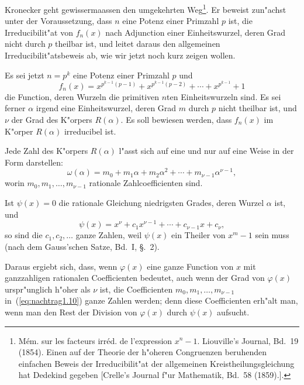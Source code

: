 \documentclass[10pt,a4paper]{article}
\theoremstyle{weberstyle}
\begin{document}
Kronecker geht gewissermaassen den umgekehrten Weg\footnote{M\'em. sur
les facteurs irr\'ed. de l'expression $x^n-1$. Liouville's Journal, Bd.~19
(1854). Einen auf der Theorie der h"oheren Congruenzen beruhenden
einfachen Beweis der Irreducibilit"at der allgemeinen Kreistheilungsgleichung
hat Dedekind gegeben [Crelle's Journal f"ur Mathematik, Bd.~58
(1859).].}. Er beweist zun"achst unter der Voraussetzung, dass $n$ eine
Potenz einer Primzahl $p$ ist, die Irreducibilit"at von $f_n(x)$ nach
Adjunction einer Einheitswurzel, deren Grad nicht durch $p$ theilbar ist,
und leitet daraus den allgemeinen Irreducibilit"atsbeweis ab, wie wir
jetzt noch kurz zeigen wollen.

Es sei jetzt $n=p^k$ eine Potenz einer Primzahl $p$ und
\begin{equation}\label{eq:nachtrag1.9}
f_n(x) = x^{p^{k-1}(p-1)} + x^{p^{k-1}(p-2)} + \cdots + x^{p^{k-1}} + 1
\end{equation}
die Function, deren Wurzeln die primitiven $n$ten Einheitswurzeln sind.
Es sei ferner $\alpha$ irgend eine Einheitswurzel, deren Grad $m$ durch
$p$ nicht theilbar ist, und $\nu$ der Grad des K"orpers $R(\alpha)$. Es
soll bewiesen werden, dass $f_n(x)$ im K"orper $R(\alpha)$ irreducibel ist.

Jede Zahl des K"orpers $R(\alpha)$ l"asst sich auf eine und nur auf eine
Weise in der Form darstellen:
\begin{equation}\label{eq:nachtrag1.10}
\omega(\alpha) = m_0 + m_1\alpha + m_2\alpha^2 + \cdots + m_{\nu-1}\alpha^{\nu-1},
\end{equation}
worin $m_0,m_1,\dots,m_{\nu-1}$ rationale Zahlcoefficienten sind.

Ist $\psi(x)=0$ die rationale Gleichung niedrigsten Grades, deren Wurzel
$\alpha$ ist, und
\begin{equation}\label{eq:nachtrag1.11}
\psi(x) = x^\nu + c_1x^{\nu-1} + \cdots + c_{\nu-1}x + c_\nu,
\end{equation}
so sind die $c_1,c_2,\dots$ ganze Zahlen, weil $\psi(x)$ ein Theiler von
$x^m-1$ sein muss (nach dem Gauss'schen Satze, Bd.~I, \S.~2).

Daraus ergiebt sich, dass, wenn $\varphi(x)$ eine ganze Function von $x$
mit ganzzahligen rationalen Coefficienten bedeutet, auch wenn der Grad
von $\varphi(x)$ urspr"unglich h"oher als $\nu$ ist, die Coefficienten
$m_0,m_1,\dots,m_{\nu-1}$ in~(\ref{eq:nachtrag1.10}) ganze Zahlen werden;
denn diese Coefficienten erh"alt man, wenn man den Rest der Division von
$\varphi(x)$ durch $\psi(x)$ aufsucht.
\end{document}
